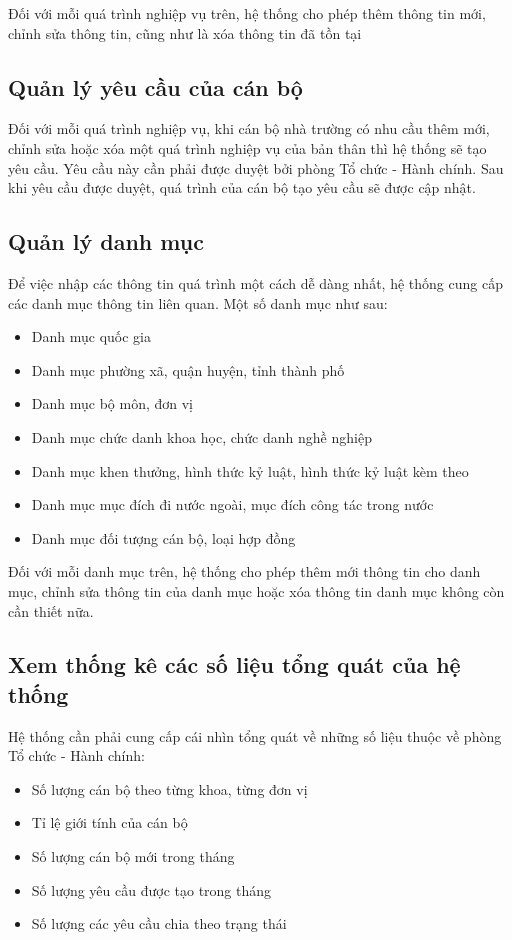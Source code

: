 Đối với mỗi quá trình nghiệp vụ trên, hệ thống cho phép thêm thông tin mới, chỉnh sửa thông tin, cũng như là xóa thông tin đã tồn tại
\subsection{Quản lý yêu cầu của cán bộ}
Đối với mỗi quá trình nghiệp vụ, khi cán bộ nhà trường có nhu cầu thêm mới, chỉnh sửa hoặc xóa một quá trình nghiệp vụ của bản thân thì hệ thống sẽ tạo yêu cầu. Yêu cầu này cần phải được duyệt bởi phòng Tổ chức - Hành chính. Sau khi yêu cầu được duyệt, quá trình của cán bộ tạo yêu cầu sẽ được cập nhật.
\subsection{Quản lý danh mục}
Để việc nhập các thông tin quá trình một cách dễ dàng nhất, hệ thống cung cấp các danh mục thông tin liên quan. Một số danh mục như sau:
\begin{itemize}
    \item Danh mục quốc gia
    \item Danh mục phường xã, quận huyện, tỉnh thành phố
    \item Danh mục bộ môn, đơn vị
    \item Danh mục chức danh khoa học, chức danh nghề nghiệp
    \item Danh mục khen thưởng, hình thức kỷ luật, hình thức kỷ luật kèm theo
    \item Danh mục mục đích đi nước ngoài, mục đích công tác trong nước
    \item Danh mục đối tượng cán bộ, loại hợp đồng
\end{itemize}

Đối với mỗi danh mục trên, hệ thống cho phép thêm mới thông tin cho danh mục, chỉnh sửa thông tin của danh mục hoặc xóa thông tin danh mục không còn cần thiết nữa.
\subsection{Xem thống kê các số liệu tổng quát của hệ thống}
Hệ thống cần phải cung cấp cái nhìn tổng quát về những số liệu thuộc về phòng Tổ chức - Hành chính:
\begin{itemize}
    \item Số lượng cán bộ theo từng khoa, từng đơn vị
    \item Tỉ lệ giới tính của cán bộ
    \item Số lượng cán bộ mới trong tháng
    \item Số lượng yêu cầu được tạo trong tháng
    \item Số lượng các yêu cầu chia theo trạng thái
\end{itemize}
